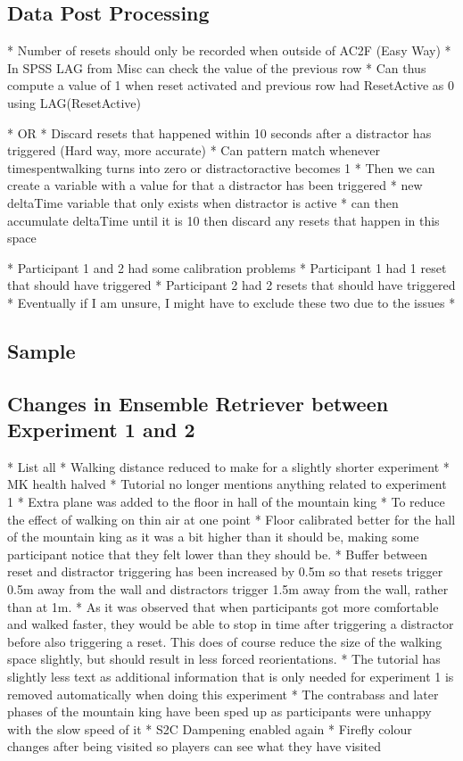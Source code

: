 \subsection{Data Post Processing}
   * Number of resets should only be recorded when outside of AC2F (Easy Way)
   * In SPSS LAG from Misc can check the value of the previous row
   * Can thus compute a value of 1 when reset activated and previous row had ResetActive as 0 using LAG(ResetActive)
   
   * OR
   * Discard resets that happened within 10 seconds after a distractor has triggered (Hard way, more accurate)
      * Can pattern match whenever timespentwalking turns into zero or distractoractive becomes 1
      * Then we can create a variable with a value for that a distractor has been triggered
      * new deltaTime variable that only exists when distractor is active
      * can then accumulate deltaTime until it is 10 then discard any resets that happen in this space
   
   * Participant 1 and 2 had some calibration problems
      * Participant 1 had 1 reset that should have triggered
      * Participant 2 had 2 resets that should have triggered
      * Eventually if I am unsure, I might have to exclude these two due to the issues
      * 


\subsection{Sample}

\subsection{Changes in Ensemble Retriever between Experiment 1 and 2}
   * List all
   * Walking distance reduced to make for a slightly shorter experiment
   * MK health halved
   * Tutorial no longer mentions anything related to experiment 1
   * Extra plane was added to the floor in hall of the mountain king
      * To reduce the effect of walking on thin air at one point
   * Floor calibrated better for the hall of the mountain king as it was a bit higher than it should be, making some participant notice that they felt lower than they should be. 
   * Buffer between reset and distractor triggering has been increased by 0.5m so that resets trigger 0.5m away from the wall and distractors trigger 1.5m away from the wall, rather than at 1m. 
      * As it was observed that when participants got more comfortable and walked faster, they would be able to stop in time after triggering a distractor before also triggering a reset. This does of course reduce the size of the walking space slightly, but should result in less forced reorientations.
   * The tutorial has slightly less text as additional information that is only needed for experiment 1 is removed automatically when doing this experiment
   * The contrabass and later phases of the mountain king have been sped up as participants were unhappy with the slow speed of it
   * S2C Dampening enabled again
   * Firefly colour changes after being visited so players can see what they have visited 


